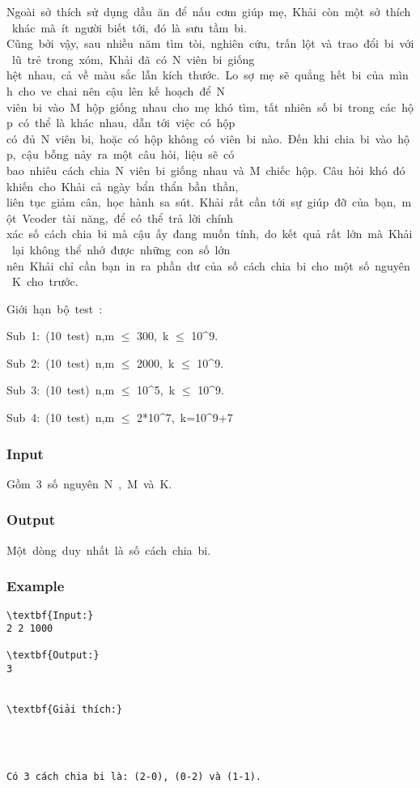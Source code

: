 



   Ngoài sở thích sử dụng dầu ăn để nấu cơm giúp mẹ, Khải còn một sở thích khác mà ít người biết tới, đó là sưu tầm bi. Cũng bởi vậy, sau nhiều năm tìm tòi, nghiên cứu, trấn lột và trao đổi bi với lũ trẻ trong xóm, Khải đã có N viên bi giống hệt nhau, cả về màu sắc lẫn kích thước. Lo sợ mẹ sẽ quẳng hết bi của mình cho ve chai nên cậu lên kế hoạch để N viên bi vào M hộp giống nhau cho mẹ khó tìm, tất nhiên số bi trong các hộp có thể là khác nhau, dẫn tới việc có hộp có đủ N viên bi, hoặc có hộp không có viên bi nào. Đến khi chia bi vào hộp, cậu bỗng nảy ra một câu hỏi, liệu sẽ có bao nhiêu cách chia N viên bi giống nhau và M chiếc hộp. Câu hỏi khó đó khiến cho Khải cả ngày bẩn thẩn bần thần, liên tục giảm cân, học hành sa sút. Khải rất cần tới sự giúp đỡ của bạn, một Vcoder tài năng, để có thể trả lời chính xác số cách chia bi mà cậu ấy đang muốn tính, do kết quả rất lớn mà Khải lại không thể nhớ được những con số lớn nên Khải chỉ cần bạn in ra phần dư của số cách chia bi cho một số nguyên K cho trước.  



   Giới hạn bộ test :  

   Sub 1: (10 test) n,m $\le$ 300, k $\le$ 10^9.  

   Sub 2: (10 test) n,m $\le$ 2000, k $\le$ 10^9.  

   Sub 3: (10 test) n,m $\le$ 10^5, k $\le$ 10^9.  

   Sub 4: (10 test) n,m $\le$ 2*10^7, k=10^9+7  



\subsubsection{   Input  }

   Gồm 3 số nguyên N , M và K.  

\subsubsection{   Output  }

   Một dòng duy nhất là số cách chia bi.  

\subsubsection{   Example  }
\begin{verbatim}
\textbf{Input:}
2 2 1000

\textbf{Output:}
3


\textbf{Giải thích:}




Có 3 cách chia bi là: (2-0), (0-2) và (1-1).\end{verbatim}
